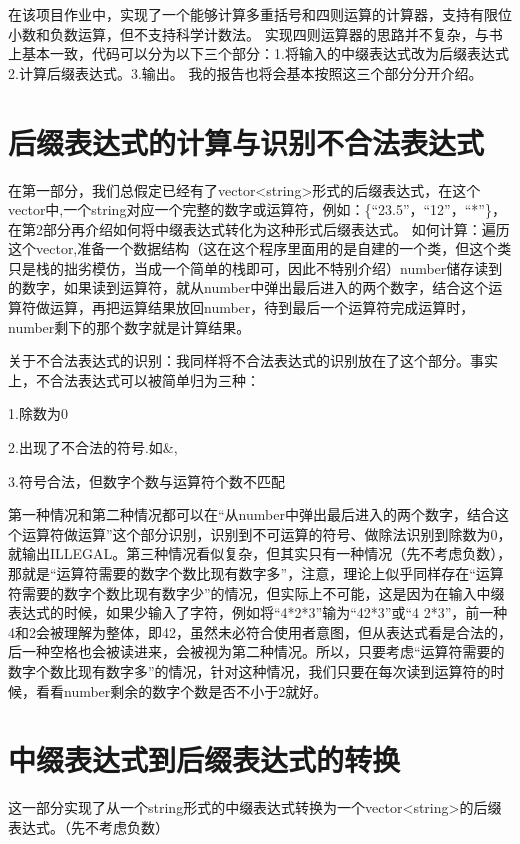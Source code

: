 \documentclass[UTF8]{ctexart}
\begin{document}
\pagestyle{fancy}
\fancyhead{}

在该项目作业中，实现了一个能够计算多重括号和四则运算的计算器，支持有限位小数和负数运算，但不支持科学计数法。
实现四则运算器的思路并不复杂，与书上基本一致，代码可以分为以下三个部分：1.将输入的中缀表达式改为后缀表达式 2.计算后缀表达式。3.输出。
我的报告也将会基本按照这三个部分分开介绍。
\section{后缀表达式的计算与识别不合法表达式}
在第一部分，我们总假定已经有了vector<string>形式的后缀表达式，在这个vector中,一个string对应一个完整的数字或运算符，例如：\{“23.5”，“12”，“*”\}，在第2部分再介绍如何将中缀表达式转化为这种形式后缀表达式。
如何计算：遍历这个vector,准备一个数据结构（这在这个程序里面用的是自建的一个类，但这个类只是栈的拙劣模仿，当成一个简单的栈即可，因此不特别介绍）number储存读到的数字，如果读到运算符，就从number中弹出最后进入的两个数字，结合这个运算符做运算，再把运算结果放回number，待到最后一个运算符完成运算时，number剩下的那个数字就是计算结果。

关于不合法表达式的识别：我同样将不合法表达式的识别放在了这个部分。事实上，不合法表达式可以被简单归为三种：

1.除数为0 

2.出现了不合法的符号.如\&,

3.符号合法，但数字个数与运算符个数不匹配

第一种情况和第二种情况都可以在“从number中弹出最后进入的两个数字，结合这个运算符做运算”这个部分识别，识别到不可运算的符号、做除法识别到除数为0，就输出ILLEGAL。第三种情况看似复杂，但其实只有一种情况（先不考虑负数），那就是“运算符需要的数字个数比现有数字多”，注意，理论上似乎同样存在“运算符需要的数字个数比现有数字少”的情况，但实际上不可能，这是因为在输入中缀表达式的时候，如果少输入了字符，例如将“4*2*3”输为“42*3”或“4 2*3”，前一种4和2会被理解为整体，即42，虽然未必符合使用者意图，但从表达式看是合法的，后一种空格也会被读进来，会被视为第二种情况。所以，只要考虑“运算符需要的数字个数比现有数字多”的情况，针对这种情况，我们只要在每次读到运算符的时候，看看number剩余的数字个数是否不小于2就好。


\section{中缀表达式到后缀表达式的转换}
这一部分实现了从一个string形式的中缀表达式转换为一个vector<string>的后缀表达式。（先不考虑负数）
\end{document}
